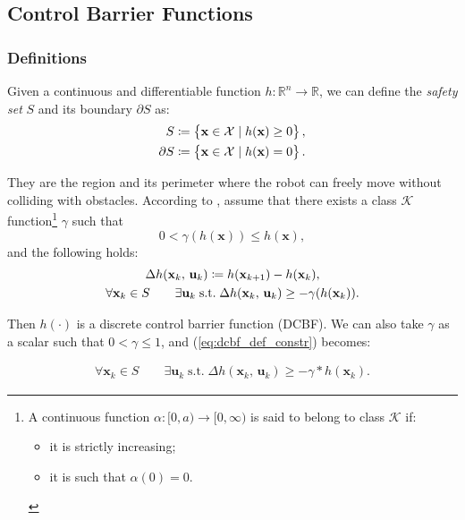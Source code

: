 \subsection{Control Barrier Functions}

\subsubsection{Definitions}
Given a continuous and differentiable function $h: \mathbb{R}^n \rightarrow \mathbb{R}$, we can define the \textit{safety set} $S$ and its boundary $\partial S$ as:
\begin{align*}
S \coloneqq \left\{ \mathbf{x} \in \mathcal{X} \mid  h(\mathbf{x}) \geq 0\right\}, \notag \\
\partial S \coloneqq \left\{ \mathbf{x} \in \mathcal{X} \mid  h(\mathbf{x}) = 0\right\}. \notag  \\
\end{align*}

They are the region and its perimeter where the robot can freely move without colliding with obstacles.
According to \cite{zeng2021safetycriticalmodelpredictivecontrol}, %
assume that there exists a class $\mathcal{K}$ function\footnote{A continuous function $\alpha \colon [0, a) \to  [0, \infty)$ is said to belong to class $\mathcal{K}$ if: 
\begin{itemize}
    \item it is strictly increasing;
    \item it is such that $\alpha(0) = 0$.
\end{itemize}
} $\gamma$ such that
$$
0 < \gamma(h(\mathbf{x})) \leq h(\mathbf{x}),
$$
and the following holds:
\begin{gather}
\Delta h(\mathbf{x}_k,\, \mathbf{u}_k) \coloneqq h(\mathbf{x}_{k+1}) - h(\mathbf{x}_{k}), \notag \\
\forall \mathbf{x}_k \in S \qquad \exists \mathbf{u}_k \; \text{s.t.} \; \Delta h(\mathbf{x}_k,\, \mathbf{u}_k) \geq -\gamma(h(\mathbf{x}_k)). \label{eq:dcbf_def_constr}
\end{gather}

Then $h(\cdot)$ is a discrete control barrier function (DCBF). We can also take $\gamma$ as a scalar such that $0 < \gamma \leq 1$, and (\ref{eq:dcbf_def_constr}) becomes:

\begin{gather*}
    \forall \mathbf{x}_k \in S \qquad \exists \mathbf{u}_k \; \text{s.t.} \; \Delta h(\mathbf{x}_k,\, \mathbf{u}_k) \geq -\gamma * h(\mathbf{x}_k). 
\end{gather*}

